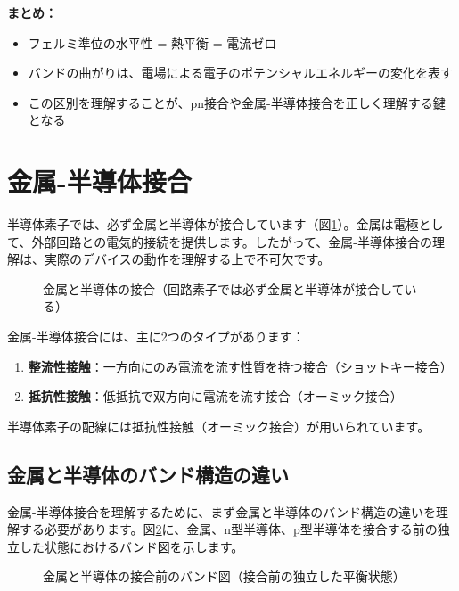 \textbf{まとめ：}

\begin{itemize}
\item フェルミ準位の水平性 = 熱平衡 = 電流ゼロ
\item バンドの曲がりは、電場による電子のポテンシャルエネルギーの変化を表す
\item この区別を理解することが、pn接合や金属-半導体接合を正しく理解する鍵となる
\end{itemize}


\section{金属-半導体接合}

半導体素子では、必ず金属と半導体が接合しています（図\ref{fig:metal_semiconductor_necessity}）。金属は電極として、外部回路との電気的接続を提供します。したがって、金属-半導体接合の理解は、実際のデバイスの動作を理解する上で不可欠です。

\begin{figure}[H]
\centering
{}
\caption{金属と半導体の接合（回路素子では必ず金属と半導体が接合している）}
\label{fig:metal_semiconductor_necessity}
\end{figure}

金属-半導体接合には、主に2つのタイプがあります：
\begin{enumerate}
\item \textbf{整流性接触}：一方向にのみ電流を流す性質を持つ接合（ショットキー接合）
\item \textbf{抵抗性接触}：低抵抗で双方向に電流を流す接合（オーミック接合）
\end{enumerate}

半導体素子の配線には抵抗性接触（オーミック接合）が用いられています。

\subsection{金属と半導体のバンド構造の違い}

金属-半導体接合を理解するために、まず金属と半導体のバンド構造の違いを理解する必要があります。図\ref{fig:metal_semiconductor_band}に、金属、n型半導体、p型半導体を接合する前の独立した状態におけるバンド図を示します。

\begin{figure}[H]
\centering
{}
\caption{金属と半導体の接合前のバンド図（接合前の独立した平衡状態）}
\label{fig:metal_semiconductor_band}
\end{figure}


